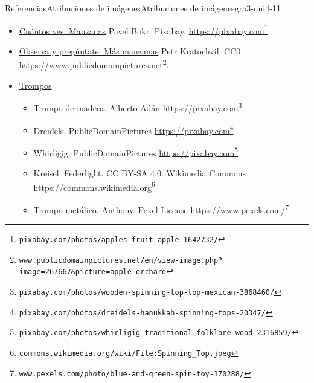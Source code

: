 \documentclass[oneside,10pt,]{article}
\begin{document}
\begin{references-section}{Referencias}{Atribuciones de imágenes}{}{Atribuciones de imágenes}{}{}{gra3-uni4-11}
%
\begin{itemize}[label=\textbullet]
\item{}\hyperref[warm-cuantosVes-Manzanas]{Cuántos ves: Manzanas} Pavel Bokr. Pixabay. \href{https://pixabay.com/photos/apples-fruit-apple-1642732/}{https:\slash{}\slash{}pixabay.com}\footnote{\nolinkurl{pixabay.com/photos/apples-fruit-apple-1642732/}\label{gra3-uni4-11-2-1-3}}.%
\item{}\hyperref[warm-observa-arbolManzanas]{Observa y pregúntate: Más manzanas}  Petr Kratochvil. CC0 \href{https://www.publicdomainpictures.net/en/view-image.php?image=267667\&picture=apple-orchard}{https:\slash{}\slash{}www.publicdomainpictures.net}\footnote{\nolinkurl{www.publicdomainpictures.net/en/view-image.php?image=267667\&picture=apple-orchard}\label{gra3-uni4-11-2-2-3}}.%
\item{}\hyperref[act-trompos]{Trompos}%
%
\begin{itemize}[label=$\circ$]
\item{}Trompo de madera. Alberto Adán \href{https://pixabay.com/photos/wooden-spinning-top-top-mexican-3868460/}{https:\slash{}\slash{}pixabay.com}\footnote{\nolinkurl{pixabay.com/photos/wooden-spinning-top-top-mexican-3868460/}\label{gra3-uni4-11-2-3-2-1-2}}.%
\item{}Dreidels. PublicDomainPictures \href{https://pixabay.com/photos/dreidels-hanukkah-spinning-tops-20347/}{https:\slash{}\slash{}pixabay.com}\footnote{\nolinkurl{pixabay.com/photos/dreidels-hanukkah-spinning-tops-20347/}\label{gra3-uni4-11-2-3-2-2-2}}%
\item{}Whirligig. PublicDomainPictures \href{https://pixabay.com/photos/whirligig-traditional-folklore-wood-2316859/}{https:\slash{}\slash{}pixabay.com}\footnote{\nolinkurl{pixabay.com/photos/whirligig-traditional-folklore-wood-2316859/}\label{gra3-uni4-11-2-3-2-3-2}}%
\item{}Kreisel. Federlight. CC BY-SA 4.0. Wikimedia Commons \href{https://commons.wikimedia.org/wiki/File:Spinning_Top.jpeg}{https:\slash{}\slash{}commons.wikimedia.org}\footnote{\nolinkurl{commons.wikimedia.org/wiki/File:Spinning_Top.jpeg}\label{gra3-uni4-11-2-3-2-4-2}}%
\item{}Trompo metálico.  Anthony. Pexel License \href{https://www.pexels.com/photo/blue-and-green-spin-toy-170288/}{https:\slash{}\slash{}www.pexels.com\slash{}}\footnote{\nolinkurl{www.pexels.com/photo/blue-and-green-spin-toy-170288/}\label{gra3-uni4-11-2-3-2-5-2}}%

\end{itemize}
\end{itemize}
\end{references-section}
\end{document}
